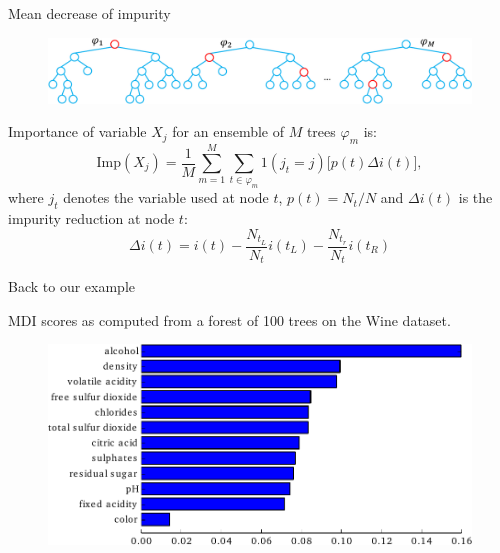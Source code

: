 \documentclass{beamer}
\begin{document}
\begin{frame}{Mean decrease of impurity}

\begin{figure}
    \includegraphics[scale=0.4]{./figures/mdi.pdf}
\end{figure}

Importance of variable $X_j$ for an ensemble of $M$ trees $\varphi_{m}$ is:
\begin{equation*}
\text{Imp}(X_j) = \frac{1}{M} \sum_{m=1}^M \sum_{t \in \varphi_{m}} 1(j_t = j) \Big[ p(t) \Delta i(t) \Big],
\end{equation*}
where $j_t$ denotes the variable used at node $t$, $p(t)=N_t/N$ and $\Delta i(t)$ is the impurity reduction at node $t$:
\begin{equation*}
\Delta i(t) = i(t) - \frac{N_{t_L}}{N_t} i(t_L) - \frac{N_{t_r}}{N_t} i(t_R)
\end{equation*}

\end{frame}

\begin{frame}{Back to our example}

MDI scores as computed from a forest of 100 trees on the Wine dataset.

\begin{figure}
    \includegraphics[scale=0.7]{./figures/imp-wine.pdf}
\end{figure}

\end{frame}
\end{document}
